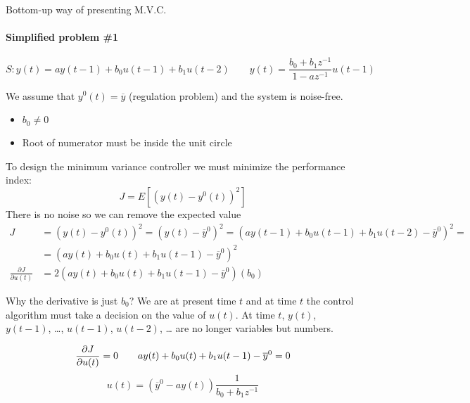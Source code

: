 Bottom-up way of presenting M.V.C.

\paragraph{Simplified problem \#1}
\[
    S: y(t) = ay(t-1) + b_0u(t-1) + b_1u(t-2) \qquad y(t) = \frac{b_0+b_1z^{-1}}{1-az^{-1}}u(t-1)
\]

We assume that $y^0(t)=\overline{y}$ (regulation problem) and the system is noise-free.
\begin{itemize}
    \item $b_0\ne 0$
    \item Root of numerator must be inside the unit circle
\end{itemize}

To design the minimum variance controller we must minimize the performance index:
\[
    J = E\left[ (y(t) - y^0(t))^2 \right]
\]
There is no noise so we can remove the expected value
\begin{align*}
    J &= \left( y(t) - y^0(t) \right)^2 = \left( y(t) - \overline{y}^0 \right)^2 = \left( ay(t-1)+b_0u(t-1)+b_1u(t-2) - \overline{y}^0 \right)^2 = \\
    &= \left( ay(t) + b_0u(t) + b_1u(t-1)-\overline{y}^0 \right)^2 \\
    \frac{\partial J}{\partial u(t)} &= 2\left( ay(t)+b_0u(t)+b_1u(t-1)-\overline{y}^0 \right)\left(b_0\right)
\end{align*}

Why the derivative is just $b_0$? We are at present time $t$ and at time $t$ the control algorithm must take a decision on the value of $u(t)$.
At time $t$, $y(t)$, $y(t-1)$, \dots, $u(t-1)$, $u(t-2)$, \dots{} are no longer variables but numbers.

\[
    \frac{\partial J}{\partial u(t)} = 0 \qquad ay(t)+b_0u(t)+b_1u(t-1)-\overline{y}^0 = 0 \\
\]
\[
    u(t) = \left( \overline{y}^0  - ay(t)\right)\frac{1}{b_0+b_1z^{-1}}
\]
\begin{figure}[H]
    \centering
\end{figure}

